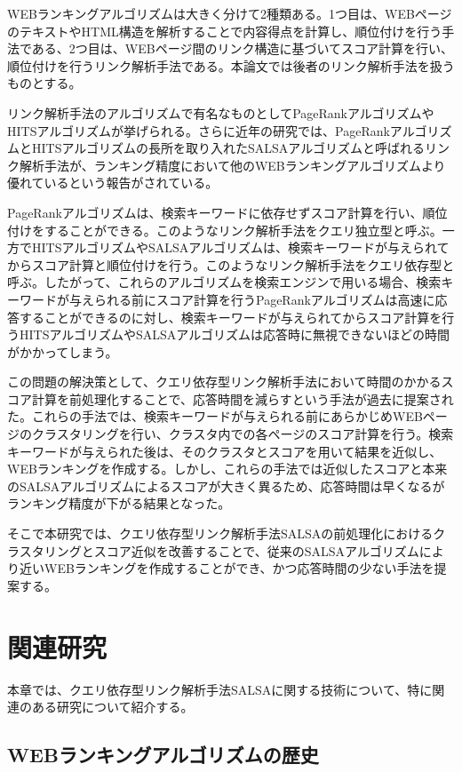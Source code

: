 \documentclass[a4paper,11pt]{jreport}
\begin{document}
WEBランキングアルゴリズムは大きく分けて2種類ある。1つ目は、WEBページのテキストやHTML構造を解析することで内容得点を計算し、順位付けを行う手法である、2つ目は、WEBページ間のリンク構造に基づいてスコア計算を行い、順位付けを行うリンク解析手法である。本論文では後者のリンク解析手法を扱うものとする。

リンク解析手法のアルゴリズムで有名なものとしてPageRankアルゴリズムやHITSアルゴリズムが挙げられる。さらに近年の研究では、PageRankアルゴリズムとHITSアルゴリズムの長所を取り入れたSALSAアルゴリズムと呼ばれるリンク解析手法が、ランキング精度において他のWEBランキングアルゴリズムより優れているという報告がされている。

PageRankアルゴリズムは、検索キーワードに依存せずスコア計算を行い、順位付けをすることができる。このようなリンク解析手法をクエリ独立型と呼ぶ。一方でHITSアルゴリズムやSALSAアルゴリズムは、検索キーワードが与えられてからスコア計算と順位付けを行う。このようなリンク解析手法をクエリ依存型と呼ぶ。したがって、これらのアルゴリズムを検索エンジンで用いる場合、検索キーワードが与えられる前にスコア計算を行うPageRankアルゴリズムは高速に応答することができるのに対し、検索キーワードが与えられてからスコア計算を行うHITSアルゴリズムやSALSAアルゴリズムは応答時に無視できないほどの時間がかかってしまう。

この問題の解決策として、クエリ依存型リンク解析手法において時間のかかるスコア計算を前処理化することで、応答時間を減らすという手法が過去に提案された。これらの手法では、検索キーワードが与えられる前にあらかじめWEBページのクラスタリングを行い、クラスタ内での各ページのスコア計算を行う。検索キーワードが与えられた後は、そのクラスタとスコアを用いて結果を近似し、WEBランキングを作成する。しかし、これらの手法では近似したスコアと本来のSALSAアルゴリズムによるスコアが大きく異るため、応答時間は早くなるがランキング精度が下がる結果となった。

そこで本研究では、クエリ依存型リンク解析手法SALSAの前処理化におけるクラスタリングとスコア近似を改善することで、従来のSALSAアルゴリズムにより近いWEBランキングを作成することができ、かつ応答時間の少ない手法を提案する。



\chapter{関連研究}

本章では、クエリ依存型リンク解析手法SALSAに関する技術について、特に関連のある研究について紹介する。

\section{WEBランキングアルゴリズムの歴史}
\end{document}
